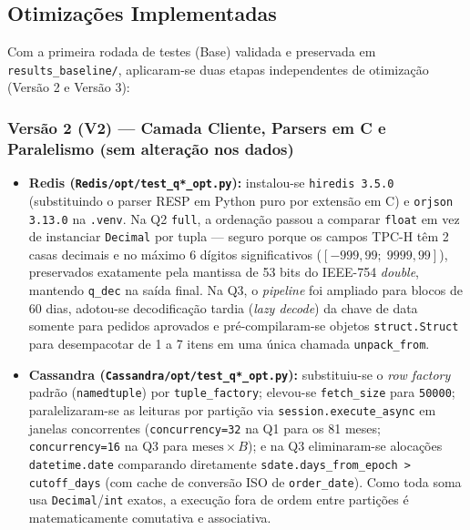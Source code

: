 \documentclass[12pt,a4paper]{article}
\begin{document}
\subsection{Otimizações Implementadas}
Com a primeira rodada de testes (Base) validada e preservada em \texttt{results\_baseline/}, aplicaram-se duas etapas independentes de otimização (Versão 2 e Versão 3):

\subsubsection*{Versão 2 (V2) --- Camada Cliente, Parsers em C e Paralelismo (sem alteração nos dados)}
\begin{itemize}
    \item \textbf{Redis (\texttt{Redis/opt/test\_q*\_opt.py}):} instalou-se \texttt{hiredis 3.5.0} (substituindo o parser RESP em Python puro por extensão em C) e \texttt{orjson 3.13.0} na \texttt{.venv}. Na Q2 \texttt{full}, a ordenação passou a comparar \texttt{float} em vez de instanciar \texttt{Decimal} por tupla --- seguro porque os campos TPC-H têm 2 casas decimais e no máximo 6 dígitos significativos ($[-999{,}99;\; 9999{,}99]$), preservados exatamente pela mantissa de 53 bits do IEEE-754 \textit{double}, mantendo \texttt{q\_dec} na saída final. Na Q3, o \textit{pipeline} foi ampliado para blocos de 60 dias, adotou-se decodificação tardia (\textit{lazy decode}) da chave de data somente para pedidos aprovados e pré-compilaram-se objetos \texttt{struct.Struct} para desempacotar de 1 a 7 itens em uma única chamada \texttt{unpack\_from}.
    \item \textbf{Cassandra (\texttt{Cassandra/opt/test\_q*\_opt.py}):} substituiu-se o \textit{row factory} padrão (\texttt{namedtuple}) por \texttt{tuple\_factory}; elevou-se \texttt{fetch\_size} para \texttt{50000}; paralelizaram-se as leituras por partição via \texttt{session.execute\_async} em janelas concorrentes (\texttt{concurrency=32} na Q1 para os 81 meses; \texttt{concurrency=16} na Q3 para $\text{meses} \times B$); e na Q3 eliminaram-se alocações \texttt{datetime.date} comparando diretamente \texttt{sdate.days\_from\_epoch > cutoff\_days} (com cache de conversão ISO de \texttt{order\_date}). Como toda soma usa \texttt{Decimal}/\texttt{int} exatos, a execução fora de ordem entre partições é matematicamente comutativa e associativa.
\end{itemize}
\end{document}
